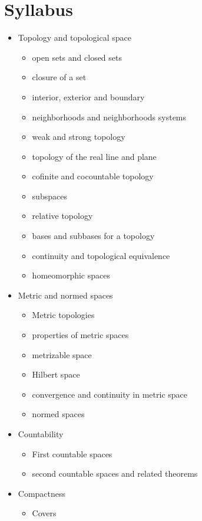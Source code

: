 \documentclass[../main-sheet.tex]{subfiles}
\begin{document}
\chapter*{Syllabus}
\begin{itemize}
    \item Topology and topological space
    \begin{itemize}
        \item open sets and closed sets 
        \item closure of a set
        \item interior, exterior and boundary
        \item neighborhoods and neighborhoods systems 
        \item weak and strong topology
        \item topology of the real line and plane
        \item cofinite and cocountable topology
        \item subspaces
        \item relative topology
        \item bases and subbases for a topology
        \item continuity and topological equivalence
        \item homeomorphic spaces
    \end{itemize}
    \item  Metric and normed spaces
    \begin{itemize}
        \item Metric topologies
        \item properties of metric spaces
        \item metrizable space
        \item Hilbert space
        \item convergence and continuity in metric space
        \item normed spaces
    \end{itemize}
    \item  Countability
    \begin{itemize}
        \item First countable spaces
        \item second countable spaces and related theorems
    \end{itemize}
    \item Compactness
    \begin{itemize}
        \item Covers

\end{itemize}
\end{itemize}
\end{document}
